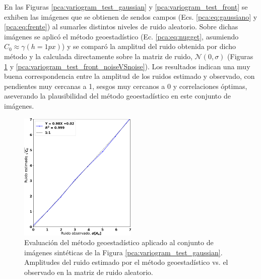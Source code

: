            En las Figuras \ref{pca:variogram_test_gaussian} y \ref{pca:variogram_test_front} se exhiben las imágenes que se obtienen de sendos campos (Ecs. \ref{pca:eq:gaussiano} y \ref{pca:eq:frente}) al sumarles distintos niveles de ruido aleatorio. Sobre dichas imágenes se aplicó el método geoestadístico (Ec. \ref{pca:eq:nugget}, asumiendo $C_{0} \approx \gamma(h=1px)$) y se comparó la amplitud del ruido obtenida por dicho método y la calculada directamente sobre la matriz de ruido, $\mathcal{N}(0,\sigma)$ (Figuras \ref{pca:variogram_test_gaussian_noiseVSnoise} y \ref{pca:variogram_test_front_noiseVSnoise}). Los resultados indican una muy buena correspondencia entre la amplitud de los ruidos estimado y observado, con pendientes muy cercanas a 1, sesgos muy cercanos a 0 y correlaciones óptimas, aseverando la plausibilidad del método geoestadístico en este conjunto de imágenes.

            \begin{figure}
            \centering
            \includegraphics[width=0.5\textwidth]{pca/figures/variogram_test_gaussian_noiseVSnoise.png}
            \caption[Evaluación del método geoestadístico aplicado al conjunto de imágenes sintéticas de campo gaussiano 2D.]{Evaluación del método geoestadístico aplicado al conjunto de imágenes sintéticas de la Figura \ref{pca:variogram_test_gaussian}. Amplitudes del ruido estimado por el método geoestadístico vs. el observado en la matriz de ruido aleatorio.}
            \label{pca:variogram_test_gaussian_noiseVSnoise}
            \end{figure}
    
